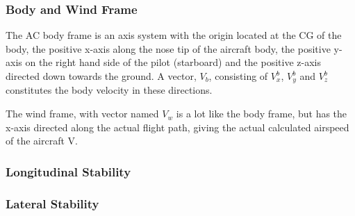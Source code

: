 \subsubsection{Body and Wind Frame}

The AC body frame is an axis system with the origin located at the CG of the body, the positive x-axis along the nose tip of the aircraft body, the positive y-axis on the right hand side of the pilot (starboard) and the positive z-axis directed down towards the ground. A vector, \textbf{$V_b$}, consisting of $V^b_x$, $V^b_y$ and $V^b_z$ constitutes the body velocity in these directions.

The wind frame, with vector named \textbf{$V_w$} is a lot like the body frame, but has the x-axis directed along the actual flight path, giving the actual calculated airspeed of the aircraft V.



\subsubsection{Longitudinal Stability}
\subsubsection{Lateral Stability}




